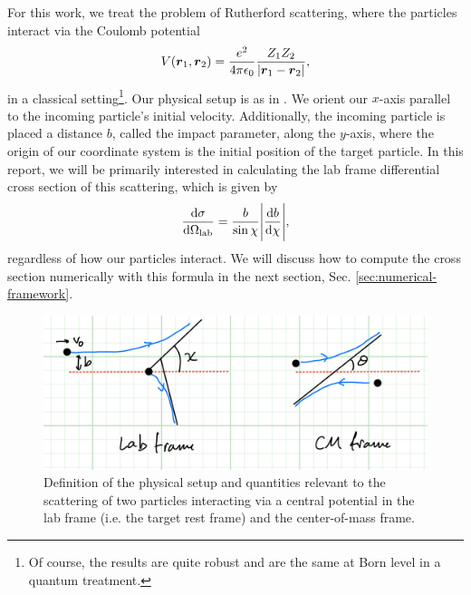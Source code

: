 For this work, we treat the problem of Rutherford scattering, where the particles interact via the Coulomb potential 
\begin{align}
    V(\vb*{r}_{1},\vb*{r}_{2}) = \frac{e^2}{4 \pi \epsilon_0} \frac{Z_1 Z_2}{|\vb*{r}_{1} - \vb*{r}_{2}|}
,\end{align}
in a classical setting\footnote{Of course, the results are quite robust and are the same at Born level in a quantum treatment.}.
Our physical setup is as in .
We orient our $x$-axis parallel to the incoming particle's initial velocity.
Additionally, the incoming particle is placed a distance $b$, called the impact parameter, along the $y$-axis, where the origin of our coordinate system is the initial position of the target particle.
In this report, we will be primarily interested in calculating the lab frame differential cross section of this scattering, which is given by
\begin{align}
\label{eq:lab-cross-section}
    \dv{\sigma}{\Omega_{\rm lab}} = \frac{b}{\sin{\chi}} \Bigg| \dv{b}{\chi} \Bigg|
,\end{align}
regardless of how our particles interact.
We will discuss how to compute the cross section numerically with this formula in the next section, Sec. \ref{sec:numerical-framework}.

\begin{figure}[h!tb]
    \centering
    \includegraphics[width=\textwidth]{xsec-frames.jpeg}
    \caption{Definition of the physical setup and quantities relevant to the scattering of two particles interacting via a central potential in the lab frame (i.e. the target rest frame) and the center-of-mass frame.}
    \label{fig:scattering-setup}
\end{figure}

